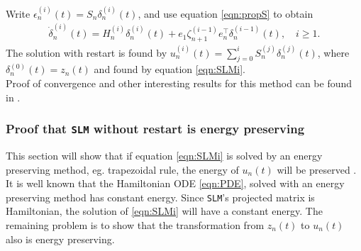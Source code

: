\noindent Write $ \epsilon^{(i)}_n(t)  = S_n \delta_n^{(i)}(t) $, and use equation \eqref{eqn:propS} to obtain
\begin{equation}
\begin{aligned}
\dot{\delta}_n^{(i)}(t) = H_n^{(i)} \delta_n^{(i)}(t) + e_1 \zeta_{n+1}^{(i-1)} e_n^\top \delta_n^{(i-1)}(t), \quad i \geq 1.
\label{eqn:SLMr}
\end{aligned}
\end{equation}
\noindent The solution with restart is found by $ u_n^{(i)}(t) = \sum \limits_{j = 0} ^i S_n^{(j)} \delta_n^{(j)} (t) $, where $\delta_n^{(0)} (t) = z_n(t)$ and found by equation \eqref{eqn:SLMi}.\\

\noindent Proof of convergence and other interesting results for this method can be found in \cite{SLMinteresting}. 

\subsubsection{Proof that \texttt{SLM} without restart is energy preserving} %
This section will show that if equation \eqref{eqn:SLMi} is solved by an energy preserving method, eg. trapezoidal rule, the energy of $u_n(t)$ will be preserved \cite{SLMpreserve}. It is well known that the Hamiltonian ODE \eqref{eqn:PDE}, solved with an energy preserving method has constant energy. Since \texttt{SLM}'s projected matrix is Hamiltonian, the solution of \eqref{eqn:SLMi} will have a constant energy. The remaining problem is to show that the transformation from $z_n(t)$ to $u_n(t)$ also is energy preserving.\\

